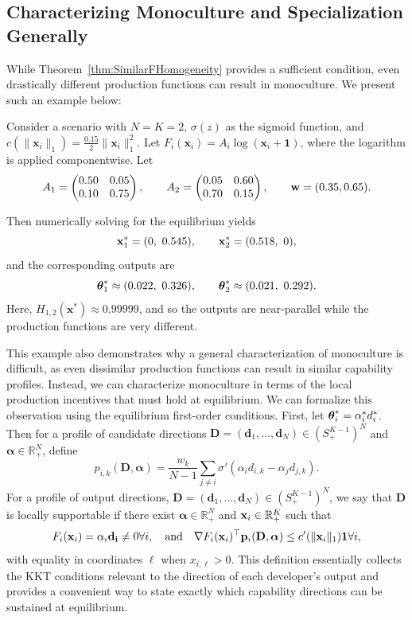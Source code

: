 \subsection{Characterizing Monoculture and Specialization Generally}
While Theorem~\ref{thm:SimilarFHomogeneity} provides a sufficient condition, even drastically different production functions can result in monoculture.
We present such an example below:
\begin{example}
\label{ex:monoculture_not_equal}
    Consider a scenario with $N=K=2$, $\sigma(z)$ as the sigmoid function, and $c(\lVert \mathbf{x}_{i} \rVert _1) = \frac{0.15}{2} \lVert \mathbf{x}_i \rVert_1^{2}$. 
    Let $F_i(\mathbf{x}_i)=A_i\log(\mathbf{x}_i+\mathbf{1})$,
    where the logarithm is applied componentwise.
    Let 
    \[ A_1=
    \begin{pmatrix}
    0.50 & 0.05\\
    0.10 & 0.75
    \end{pmatrix},
    \qquad
    A_2=
    \begin{pmatrix}
    0.05 & 0.60\\
    0.70 & 0.15
    \end{pmatrix},
    \qquad
    \mathbf{w}=(0.35,0.65).
    \]
        
    Then numerically solving for the equilibrium yields 
    \[
    \bx_1^*=(0,\ 0.545), \qquad \bx_2^*=(0.518,\ 0),
    \]
    and the corresponding outputs are 
    \[
    \boldsymbol{\theta}_1^*\approx(0.022,\ 0.326),
    \qquad
    \boldsymbol{\theta}_2^*\approx(0.021,\ 0.292).
    \]
    Here, $H_{1,2}(\mathbf{x}^*) \approx 0.99999$, and so the outputs are near-parallel while the production functions are very different. 
\end{example}

This example also demonstrates why a general characterization of monoculture is difficult, as even dissimilar production functions can result in similar capability profiles. 
Instead, we can characterize monoculture in terms
of the local production incentives that must hold at equilibrium.
We can formalize this observation using the equilibrium
first-order conditions. 
First, let $\boldsymbol{\theta}^*_{i} = \alpha^*_i d^*_{i}$.
Then for a profile of candidate directions $\mathbf D=(\mathbf d_1,\ldots,\mathbf d_N)\in(S_+^{K-1})^N$ and $\boldsymbol{\alpha}\in\mathbb R_{+}^N$, define
\[
p_{i,k}(\mathbf D,\boldsymbol{\alpha}) = \frac{w_k}{N-1} \sum_{j\neq i} \sigma'\!\left( \alpha_i d_{i,k}-\alpha_j d_{j,k} \right).
\]
For a profile of output directions, $\mathbf{D}=(\mathbf d_1,\ldots,\mathbf d_N)\in(S_+^{K-1})^N$, we say that $\mathbf{D}$ is locally supportable if there exist
$\boldsymbol{\alpha}\in\mathbb R_{+}^N$ and
$\mathbf{x}_i\in\mathbb R_+^K$ such that
\[
F_i(\mathbf{x}_i)=\alpha_i\mathbf{d_i}\neq 0 \forall i, \quad \text{and} \quad \nabla F_i(\mathbf{x}_i)^\top
\mathbf{p}_i(\mathbf{D},\boldsymbol{\alpha})
\leq
c'(\|\mathbf{x}_i\|_1)\mathbf 1 \forall i,
\]
with equality in coordinates $\ell$ when
$x_{i,\ell}>0$.
This definition essentially collects the KKT conditions relevant to the direction of each developer's output and provides a convenient way to
state exactly which capability directions can be sustained at equilibrium.


